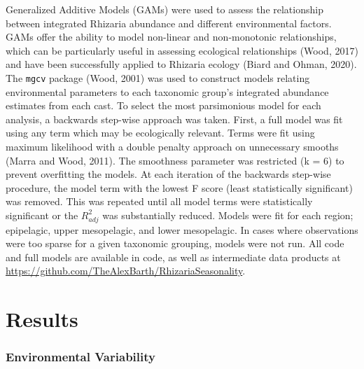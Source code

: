 \documentclass[
]{article}
\begin{document}
Generalized Additive Models (GAMs) were used to assess the relationship
between integrated Rhizaria abundance and different environmental
factors. GAMs offer the ability to model non-linear and non-monotonic
relationships, which can be particularly useful in assessing ecological
relationships (Wood, 2017) and have been successfully applied to
Rhizaria ecology (Biard and Ohman, 2020). The \texttt{mgcv} package
(Wood, 2001) was used to construct models relating environmental
parameters to each taxonomic group's integrated abundance estimates from
each cast. To select the most parsimonious model for each analysis, a
backwards step-wise approach was taken. First, a full model was fit
using any term which may be ecologically relevant. Terms were fit using
maximum likelihood with a double penalty approach on unnecessary smooths
(Marra and Wood, 2011). The smoothness parameter was restricted (k = 6)
to prevent overfitting the models. At each iteration of the backwards
step-wise procedure, the model term with the lowest F score (least
statistically significant) was removed. This was repeated until all
model terms were statistically significant or the \(R^2_{adj}\) was
substantially reduced. Models were fit for each region; epipelagic,
upper mesopelagic, and lower mesopelagic. In cases where observations
were too sparse for a given taxonomic grouping, models were not run. All
code and full models are available in code, as well as intermediate data
products at \url{https://github.com/TheAlexBarth/RhizariaSeasonality}.

\hypertarget{results}{%
\section{Results}\label{results}}

\hypertarget{environmental-variability}{%
\subsubsection{Environmental
Variability}\label{environmental-variability}}
\end{document}
